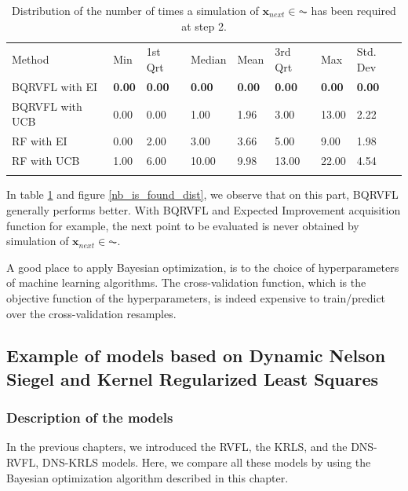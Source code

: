 \newpage

\begin{table}[!htb]
\begin{center}
\caption{Distribution of the number of times a simulation of $\textbf{x}_{next} \in \AC$ has been required at step 2.}
\label{tab:nb_sims}       %
\begin{tabular}{llllllll}
\hline\noalign{\smallskip}
Method & Min & 1st Qrt  & Median & Mean  & 3rd Qrt  & Max & Std. Dev \\
\noalign{\smallskip}\hline\noalign{\smallskip}
 BQRVFL with EI  & \textbf{0.00} & \textbf{0.00} & \textbf{0.00}  & \textbf{0.00} & \textbf{0.00} & \textbf{0.00}  & \textbf{0.00} \\
 BQRVFL with UCB & 0.00 & 0.00 & 1.00  & 1.96 & 3.00 & 13.00 & 2.22 \\
 RF with EI      & 0.00 & 2.00 & 3.00  & 3.66 & 5.00 & 9.00 & 1.98 \\
 RF with UCB     & 1.00 & 6.00 & 10.00 & 9.98 & 13.00 & 22.00 & 4.54 \\
\noalign{\smallskip}\hline
\end{tabular}
\end{center}
\end{table}

In table \ref{tab:nb_sims} and figure \ref{nb_is_found_dist}, we observe that on this part, BQRVFL generally performs better. With BQRVFL and Expected Improvement acquisition function for example, the next point to be evaluated is never obtained by simulation of $\textbf{x}_{next} \in \AC$. 


A good place to apply Bayesian optimization, is to the choice of hyperparameters of machine learning algorithms. The cross-validation function, which is the objective function of the hyperparameters, is indeed expensive to train/predict over the cross-validation resamples.  

\subsection{Example of models based on Dynamic Nelson Siegel and Kernel Regularized Least Squares}

\subsubsection{Description of the models}

In the previous chapters, we introduced the RVFL, the KRLS, and the DNS-RVFL, DNS-KRLS models. Here, we compare all these models by using the Bayesian optimization algorithm described in this chapter.  

